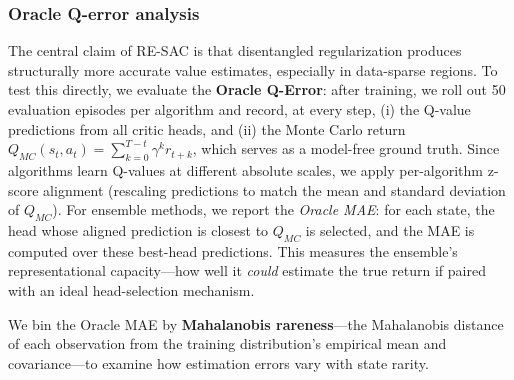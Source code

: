\documentclass[10pt]{article}
\begin{document}
\subsubsection{Oracle Q-error analysis}
\label{sec:oracle_q}
The central claim of RE-SAC is that disentangled regularization produces structurally more accurate value estimates, especially in data-sparse regions. To test this directly, we evaluate the \textbf{Oracle Q-Error}: after training, we roll out 50 evaluation episodes per algorithm and record, at every step, (i) the Q-value predictions from all critic heads, and (ii) the Monte Carlo return $Q_{MC}(s_t,a_t) = \sum_{k=0}^{T-t}\gamma^k r_{t+k}$, which serves as a model-free ground truth. Since algorithms learn Q-values at different absolute scales, we apply per-algorithm z-score alignment (rescaling predictions to match the mean and standard deviation of $Q_{MC}$). For ensemble methods, we report the \emph{Oracle MAE}: for each state, the head whose aligned prediction is closest to $Q_{MC}$ is selected, and the MAE is computed over these best-head predictions. This measures the ensemble's representational capacity---how well it \emph{could} estimate the true return if paired with an ideal head-selection mechanism.

We bin the Oracle MAE by \textbf{Mahalanobis rareness}---the Mahalanobis distance of each observation from the training distribution's empirical mean and covariance---to examine how estimation errors vary with state rarity.
\end{document}
